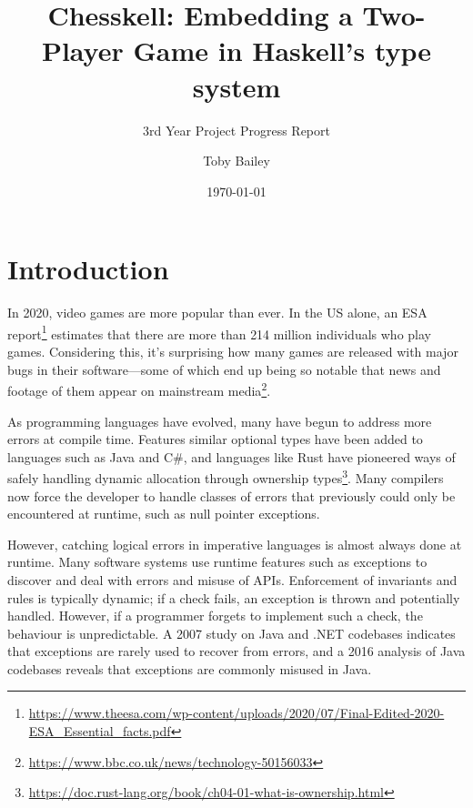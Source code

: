 \documentclass[12pt, a4paper, bibliography=totocnumbered]{scrartcl}
\title{Chesskell: Embedding a Two-Player Game in Haskell's type system}
\subtitle{3rd Year Project Progress Report}
\author{Toby Bailey}
\date{\today}
\begin{document}
\begin{titlepage}
    \maketitle
    \tableofcontents
\end{titlepage}

\section{Introduction}

In 2020, video games are more popular than ever. In the US alone, an ESA report\footnote{\url{https://www.theesa.com/wp-content/uploads/2020/07/Final-Edited-2020-ESA_Essential_facts.pdf}} estimates that there are more than 214 million individuals who play games. Considering this, it's surprising how many games are released with major bugs in their software---some of which end up being so notable that news and footage of them appear on mainstream media\footnote{\url{https://www.bbc.co.uk/news/technology-50156033}}.

As programming languages have evolved, many have begun to address more errors at compile time. Features similar optional types have been added to languages such as Java and C\#, and languages like Rust have pioneered ways of safely handling dynamic allocation through ownership types\footnote{\url{https://doc.rust-lang.org/book/ch04-01-what-is-ownership.html}}. Many compilers now force the developer to handle classes of errors that previously could only be encountered at runtime, such as null pointer exceptions.


However, catching logical errors in imperative languages is almost always done at runtime. Many software systems use runtime features such as exceptions to discover and deal with errors and misuse of APIs. Enforcement of invariants and rules is typically dynamic; if a check fails, an exception is thrown and potentially handled. However, if a programmer forgets to implement such a check, the behaviour is unpredictable. A 2007 study \cite{exceptionsusedpoorly} on Java and .NET codebases indicates that exceptions are rarely used to recover from errors, and a 2016 analysis of Java codebases \cite{badjavaexceptions} reveals that exceptions are commonly misused in Java.
\end{document}
